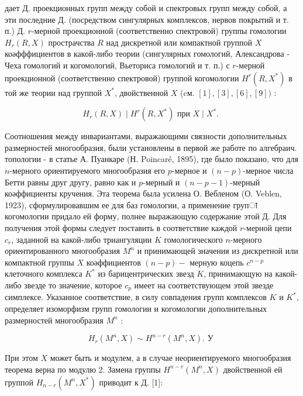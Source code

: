 \documentclass[10pt]{article}
\begin{document}
дает Д. проекционных групп между собой и спектровых групп между собой, а эти последние Д. (посредством сингулярных комплексов, нервов покрытий и т. п.) Д. $r$-мерной проекционной (соответственно спектровой) группы гомологии $H_{r}(R, X)$ прострачства $R$ над дискретной или компактной группой $X$ коәфффициентов в какой-либо теории (сингулярных гомологий, Александрова - Чеха гомологий и когомологий, Вьеториса гомологий и т. п.) с $r$-мерной проекционной (соответственно спектровой) группой когомологии $H^{r}\left(R, X^{*}\right)$ в той же теории над группой $X^{*}$, двойственной $X$ (cм. $[1],[3],[6],[9])$ :



\[

H_{r}(R, X) \mid H^{r}\left(R, X^{*}\right) \text { при } X \mid X^{*} \text {. }

\]



Соотношения между инвариантами, выражающими связности дополнительных размерностей многообразия, были установлены в первой же работе по алгебраич. топологии - в статье А. Пуанкаре (Н. Poincaré, 1895), где было показано, что для $n$-мерного ориентируемого многообразия его $p$-мерное и $(n-p)$-мерное числа Бетти равны друг другу, равно как и $p$-мерный и $(n-p-1)$-мерный коәффициенты кручения. Эта теорема была усилена О. Вебленом (О. Veblen, 1923), сформулировавшим ее для баз гомологии, а применение групा когомологии придало ей форму, полнее выражающую содержание этой Д. Для получения этой формы следует поставить в соответствие каждой $r$-мерной цепи $c_{r}$, заданной на какой-либо триангуляции $K$ гомологического $n$-мерного ориентированного многообразия $M^{n}$ и принимающей значения из дискретной или компактной группы $X$ коәффициентов $(n-p)-$ мерную коцепь $c^{n-p}$ клеточного комплекса $K^{*}$ из барицентрических звезд $K$, принимающую на какой-либо звезде то значение, которое $c_{p}$ имеет на соответствующем этой звезде симплексе. Указанное соответствие, в силу совпадения групп комплексов $K$ и $K^{*}$, определяет изоморфизм групп гомологии и когомологии дополнительных размерностей многообразия $M^{n}$ :



\[

H_{r}\left(M^{n}, X\right) \sim H^{n-r}\left(M^{n}, X\right) . \text { У }

\]



При этом $X$ может быть и модулем, а в случае неориентируемого многообразия теорема верна по модулю 2. Замена группы $H^{n-r}\left(M^{n}, X\right)$ двойственной ей группой $H_{n-r}\left(M^{n}, X^{*}\right)$ приводит к Д. [1]:
\end{document}
